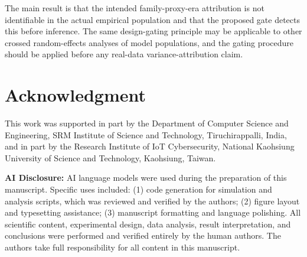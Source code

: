 \documentclass{ieeeaccess}
\theoremstyle{definition}
\theoremstyle{plain}
\begin{document}
The main result is that the intended family-proxy-era attribution is not identifiable in the actual empirical population and that the proposed gate detects this before inference. The same design-gating principle may be applicable to other crossed random-effects analyses of model populations, and the gating procedure should be applied before any real-data variance-attribution claim.

\section*{Acknowledgment}
This work was supported in part by the Department of Computer Science and Engineering, SRM Institute of Science and Technology, Tiruchirappalli, India, and in part by the Research Institute of IoT Cybersecurity, National Kaohsiung University of Science and Technology, Kaohsiung, Taiwan.

\textbf{AI Disclosure:} AI language models were used during the preparation of this manuscript. Specific uses included: (1) code generation for simulation and analysis scripts, which was reviewed and verified by the authors; (2) figure layout and typesetting assistance; (3) manuscript formatting and language polishing. All scientific content, experimental design, data analysis, result interpretation, and conclusions were performed and verified entirely by the human authors. The authors take full responsibility for all content in this manuscript.
\end{document}
